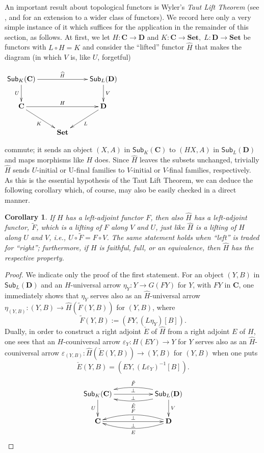 \documentclass[12pt]{amsart}
\newtheorem{cor}[thm]{Corollary}
\theoremstyle{definition}
\newcommand{\Sets}{\mathbf{Set}}
\begin{document}
An important result about topological functors is Wyler's {\em Taut Lift Theorem} (see \cite{Wyler1971a, Wyler1971b}, and \cite{Tholen1978} for an extension to a wider class of functors). We record here only a very simple instance of it which suffices for the application in the remainder of this section, as follows. At first, we let $H:\mathbf C\to \mathbf D$ and $K:\mathbf C\to\Sets,\;L:\mathbf D\to\Sets$ be functors with $L\circ H=K$ and consider the ``lifted'' functor $\widehat{H}$ that makes the diagram (in which $V$ is, like $U$, forgetful)
\begin{center}
	$\xymatrix{\mathsf{Sub}_K(\mathbf C)\ar[d]_U\ar[rr]^{\widehat{H}} 
		&& \mathsf{Sub}_L(\mathbf D)\ar[d]^V\\
		\mathbf C\ar[rr]^H\ar[rd]_K && \mathbf D\ar[ld]^L\\
		& \Sets & \\
	}$
\end{center}
commute; it sends an object $(X,A)$ in $\mathsf{Sub}_K(\mathbf C)$ to $(HX,A)$ in $\mathsf{Sub}_L(\mathbf D)$ and maps morphisms like $H$ does. Since $\widehat{H}$ leaves the subsets unchanged, trivially $\widehat{H}$ sends $U$-initial or U-final families to $V$-initial or $V$-final families, respectively. As this is the essential hypothesis of the Taut Lift Theorem, we can deduce the following corollary which, of course,  may also be easily checked in a direct manner.

\begin{cor}\label{COR_TautLift}
	If $H$ has a left-adjoint functor $F$, then also $\widehat{H}$ has a left-adjoint functor, $\tilde{F}$, which is a lifting of $F$ along $V$ and $U$, just like $\widehat{H}$ is a lifting of $H$ along $U$ and $V$,  i.e., $U\circ\tilde{F}=F\circ V$. The same statement holds when ``left'' is traded for ``right''; furthermore, if $H$ is faithful, full, or an equivalence, then $\widehat{H}$ has the respective property.
\end{cor}

\begin{proof}
	We indicate only the proof of the first statement. 
	For an object $(Y,B)$ in $\mathsf{Sub}_L(\mathbf D)$ and an $H$-universal arrow $\eta_Y:Y \to G(FY)$ for $Y$, with $FY$ in $\mathbf C$, one immediately shows that $\eta_Y$ serves also as an $\widehat{H}$-universal arrow $\eta_{(Y,B)}:(Y,B)\to \widehat{H}(\tilde{F}(Y,B))$ for $(Y,B)$, where $$\tilde{F}(Y,B):=(FY,(L\eta_Y)[B]).$$ Dually, in order to construct a right adjoint $\check{E}$ of $\widehat{H}$ from a right adjoint $E$ of $H$, one sees that an $H$-couniversal arrow $\varepsilon_Y:H(EY)\to Y$ for $Y$ serves also as an $\widehat{H}$-couniversal arrow $\varepsilon_{(Y,B)}:\widehat{H}(\check{E}(Y,B))\to (Y,B)$ for $(Y,B)$ when one puts $$\check{E}(Y,B)=(EY,(L\varepsilon_Y)^{-1}[B]).$$
	$$\xymatrix{\mathsf{Sub}_K(\mathbf C)\ar[rr]^{\bot}_{\bot}\ar[d]_U && \mathsf{Sub}_L(\mathbf D)\ar@/_0.8pc/[ll]_{\tilde{F}}\ar@/^0.8pc/[ll]^{\check{E}}\ar[d]^V\\
		\mathbf{C}\ar[rr]^{\bot}_{\bot} && \mathbf{D}\ar@/_0.8pc/[ll]_F\ar@/^0.8pc/[ll]^E\\
	}$$
\end{proof}
\end{document}
